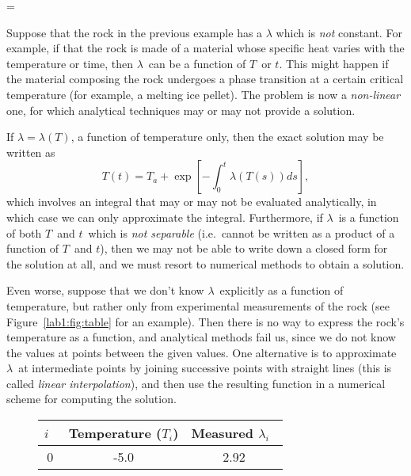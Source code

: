 \documentclass{article}
\makeatletter
\let\realnormalsize=\normalsize
\def\liih@math{\ifmmode$\else\bad@math\fi}
\def\adjustnormalsize{\def\normalsize{\mathsurround=0pt \realnormalsize
 \parindent=0pt\abovedisplayskip=0pt\belowdisplayskip=0pt}%
 \def\phantompar{\csname par\endcsname}\normalsize}%
\newcommand\lthtmlvboxmathA{\adjustnormalsize\setbox\sizebox=\vbox\bgroup %
 \let\ifinner=\iffalse \let\)\liih@math }%
\newcommand\lthtmlmathtype[1]{\gdef\lthtmlmathenv{#1}}%
\newcommand\lthtmlfigureA[1]{\let\@savefreelist\@freelist
       \lthtmlmathtype{#1}\lthtmlvboxmathA}%
\makeatother
\begin{document}
{\newpage\clearpage
\lthtmlfigureA{example229}%
\begin{example}

  Suppose that the rock in the previous example has a $\lambda$  which is \emph{not} constant.  For example, if
  that the rock is made of a material whose specific heat varies with
  the temperature or time, then $\lambda$\  can be a function of $T$\  or
  $t$.  
  This might happen if the material composing the
  rock undergoes a phase transition at a certain critical temperature
  (for example, a melting ice pellet).  
  The problem is now a \emph{non-linear} one, for which analytical
  techniques may or may not provide a solution.
\par If $\lambda=\lambda(T)$, a function of temperature only, then the
  exact solution may be written as 
  \begin{displaymath} 
  T(t) = T_a + \exp{\left[-\int^{t}_{0} \lambda(T(s))ds \right]},
  \end{displaymath}
  which involves an integral that may or may not be evaluated
  analytically, in which case we can only approximate the integral.  
  Furthermore, if $\lambda$\  is a function of both $T$\  and $t$\  which is
  \emph{not separable} (i.e.~cannot be written as a product of a
  function of $T$\  and $t$), then we may not be able to write down a
  closed form for the solution at all, and we must resort to
  numerical methods to obtain a solution.
\par Even worse, suppose that we don't know $\lambda$\  explicitly as a
  function of temperature, but rather only from experimental
  measurements of the rock (see Figure~\ref{lab1:fig:table} for an
  example).   
  Then there is no way to express the rock's temperature as a
  function, and analytical methods fail us, since we do not know the
  values at points between the given values.
  One alternative is to approximate $\lambda$\  at intermediate points by
  joining successive points with 
  straight lines (this is called \emph{linear interpolation}), and then
  use the resulting function in a numerical scheme for computing the
  solution. 
\par\begin{figure}[htbp]
    {\large     \begin{center}
      \leavevmode
      \begin{tabular}{|c|c|c|}\hline
        $i$\  & Temperature ($T_i$) & Measured $\lambda_i$\  \\\hline
        0 & -5.0 & 2.92 \\

\end{tabular}
\end{center}}
\end{figure}
\end{example}}
\end{document}
